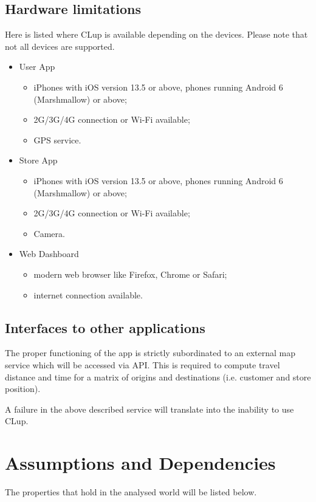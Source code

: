 \subsection{Hardware limitations}
Here is listed where CLup is available depending on the devices. Please note that not all devices are supported.
\begin{itemize}
	\item User App
		\begin{itemize}
			\item iPhones with iOS version 13.5 or above, phones running Android 6 (Marshmallow) or above;
			\item 2G/3G/4G connection or Wi-Fi available;
			\item GPS service.
		\end{itemize}
	
		\item Store App
		\begin{itemize}
			\item iPhones with iOS version 13.5 or above, phones running Android 6 (Marshmallow) or above;
			\item 2G/3G/4G connection or Wi-Fi available;
			\item Camera.
		\end{itemize}

	\item Web Dashboard
		\begin{itemize}
			\item modern web browser like Firefox, Chrome or Safari;
			\item internet connection available.
		\end{itemize}
\end{itemize}

\subsection{Interfaces to other applications}
The proper functioning of the app is strictly subordinated to an external map service which will be accessed via API. This is required to compute travel distance and time for a matrix of origins and destinations (i.e. customer and store position).

A failure in the above described service will translate into the inability to use CLup.

\clearpage

\section{Assumptions and Dependencies}
The properties that hold in the analysed world will be listed below.
